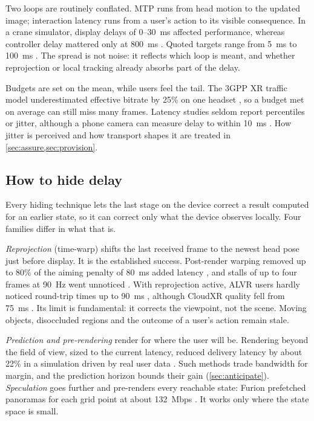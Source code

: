 Two loops are routinely conflated. MTP runs from head motion to the updated image; interaction latency
runs from a user's action to its visible consequence. In a crane simulator, display delays of 0--30~ms
affected performance, whereas controller delay mattered only at 800~ms \cite{W3086540722}. Quoted targets
range from 5~ms \cite{W3048503162} to 100~ms \cite{W2898344194}. The spread is not noise: it reflects
which loop is meant, and whether reprojection or local tracking already absorbs part of the delay.

Budgets are set on the mean, while users feel the tail. The 3GPP XR traffic model underestimated
effective bitrate by 25\% on one headset \cite{W4399340506}, so a budget met on average can still miss
many frames. Latency studies seldom report percentiles or jitter, although a phone camera can measure delay to within
10~ms \cite{W3012329178}. How jitter is perceived and
how transport shapes it are treated in \cref{sec:assure,sec:provision}.

\subsection{How to hide delay}

Every hiding technique lets the last stage on the device correct a result computed for an earlier state,
so it can correct only what the device observes locally. Four families differ in what that is.

\emph{Reprojection} (time-warp) shifts the last received frame to the newest head pose just before
display. It is the established success. Post-render warping removed up to 80\% of the aiming penalty of
80~ms added latency \cite{W3089399051}, and stalls of up to four frames at 90~Hz went unnoticed
\cite{W4301184864}. With reprojection active, ALVR users hardly noticed round-trip times up to 90~ms
\cite{W3095344018}, although CloudXR quality fell from 75~ms \cite{W4402156718}. Its limit is
fundamental: it corrects the viewpoint, not the scene. Moving objects, disoccluded regions and the outcome
of a user's action remain stale.

\emph{Prediction and pre-rendering} render for where the user will be. Rendering beyond the field of
view, sized to the current latency, reduced delivery latency by about 22\% in a simulation driven by real
user data \cite{W3161249521}. Such methods trade bandwidth for margin, and the prediction horizon bounds
their gain (\cref{sec:anticipate}). \emph{Speculation} goes further and pre-renders every reachable state:
Furion prefetched panoramas for each grid point at about 132~Mbps \cite{W2940859338}. It works only where
the state space is small.

